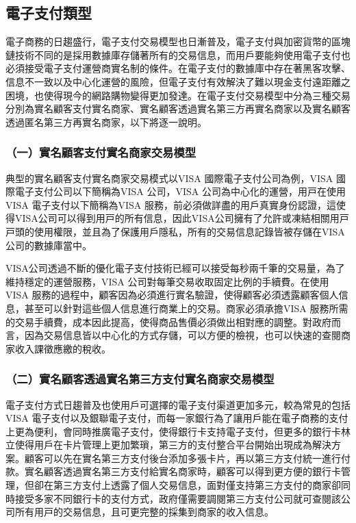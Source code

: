 	\subsection{電子支付類型}
	電子商務的日趨盛⾏，電⼦支付交易模型也日漸普及，電子支付與加密貨幣的區塊鏈技術不同的是採用數據庫存儲著所有的交易信息，而用戶要能夠使用電子支付也必須接受電子支付運營商實名制的條件。在電子支付的數據庫中存在著黑客攻擊、信息不一致以及中心化運營的風險，但電⼦⽀付有效解決了難以現金支付遠距離之困境，也使得現今的網路購物變得更加發達。在電子支付交易模型中分為三種交易分別為實名顧客支付實名商家、實名顧客透過實名第三方再實名商家以及實名顧客透過匿名第三方再實名商家，以下將逐一說明。

		\subsubsection{（一）實名顧客支付實名商家交易模型}
		典型的實名顧客支付實名商家交易模式以VISA 國際電⼦⽀付公司為例，VISA 國際電⼦⽀付公司以下簡稱為VISA 公司，VISA 公司為中⼼化的運營，⽤⼾在使用VISA 電⼦⽀付以下簡稱為VISA 服務，前必須做詳盡的用戶真實⾝份認證，這使得VISA公司可以得到⽤⼾的所有信息，因此VISA公司擁有了允許或凍結相關⽤⼾⼾頭的使用權限，並且為了保護用戶隱私，所有的交易信息記錄皆被存儲在VISA 公司的數據庫當中。

		VISA公司透過不斷的優化電⼦⽀付技術已經可以接受每秒兩千筆的交易量，為了維持穩定的運營服務，VISA 公司對每筆交易收取固定⽐例的⼿續費。在使用VISA 服務的過程中，顧客因為必須進⾏實名驗證，使得顧客必須透露顧客個⼈信息，甚⾄可以針對這些個⼈信息進⾏商業上的交易。商家必須承擔VISA 服務所需的交易⼿續費，成本因此提高，使得商品售價必須做出相對應的調整。對政府⽽⾔，因為交易信息皆以中⼼化的⽅式存儲，可以⽅便的檢視，也可以快速的查閱商家收⼊課徵應繳的稅收。
		

		\subsubsection{（二）實名顧客透過實名第三方支付實名商家交易模型}
		電⼦⽀付⽅式⽇趨普及也使用戶可選擇的電⼦⽀付渠道更加多元，較為常⾒的包括VISA 電⼦⽀付以及銀聯電⼦⽀付，⽽每⼀家銀⾏為了讓用戶能在電⼦商務的⽀付上更為便利，會同時推廣電⼦⽀付，使得銀⾏卡⽀持電⼦⽀付，但更多的銀⾏卡林⽴使得用戶在卡⽚管理上更加繁瑣，第三⽅的支付整合平台開始出現成為解決⽅案。顧客可以先在實名第三⽅⽀付後台添加多張卡⽚，再以第三⽅⽀付統一進⾏付款。實名顧客透過實名第三⽅⽀付給實名商家時，顧客可以得到更⽅便的銀⾏卡管理，但卻在第三⽅⽀付上透露了個⼈交易信息，面對僅⽀持第三⽅⽀付的商家卻同時接受多家不同銀⾏卡的⽀付⽅式，政府僅需要調閱第三⽅⽀付公司就可查閱該公司所有⽤⼾的交易信息，且可更完整的採集到商家的收⼊信息。
		

